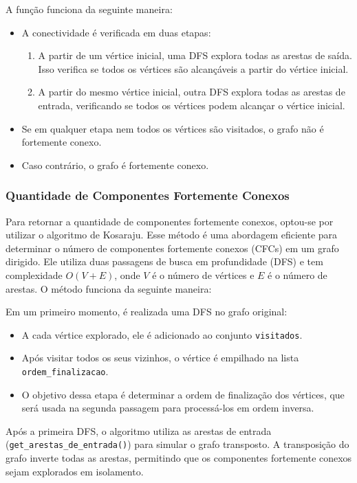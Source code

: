 \documentclass[12pt]{article}
\begin{document}
A função funciona da seguinte maneira:

\begin{itemize}
  \item A conectividade é verificada em duas etapas:
  \begin{enumerate}
    \item A partir de um vértice inicial, uma DFS explora todas as arestas de saída. Isso verifica se todos os vértices são alcançáveis a partir do vértice inicial.
    \item A partir do mesmo vértice inicial, outra DFS explora todas as arestas de entrada, verificando se todos os vértices podem alcançar o vértice inicial.
  \end{enumerate}
  \item Se em qualquer etapa nem todos os vértices são visitados, o grafo não é fortemente conexo.
  \item Caso contrário, o grafo é fortemente conexo.
\end{itemize}

\subsubsection{Quantidade de Componentes Fortemente Conexos}

Para retornar a quantidade de componentes fortemente conexos, optou-se por utilizar o algoritmo de Kosaraju. Esse método é uma abordagem eficiente para determinar o número de componentes fortemente conexos (CFCs) em um grafo dirigido. Ele utiliza duas passagens de busca em profundidade (DFS) e tem complexidade \(O(V + E)\), onde \(V\) é o número de vértices e \(E\) é o número de arestas. O método funciona da seguinte maneira:

Em um primeiro momento, é realizada uma DFS no grafo original:
\begin{itemize}
  \item A cada vértice explorado, ele é adicionado ao conjunto \texttt{visitados}.
  \item Após visitar todos os seus vizinhos, o vértice é empilhado na lista \texttt{ordem\_finalizacao}.
  \item O objetivo dessa etapa é determinar a ordem de finalização dos vértices, que será usada na segunda passagem para processá-los em ordem inversa.
\end{itemize}

Após a primeira DFS, o algoritmo utiliza as arestas de entrada (\texttt{get\_arestas\_de\_entrada()}) para simular o grafo transposto. A transposição do grafo inverte todas as arestas, permitindo que os componentes fortemente conexos sejam explorados em isolamento.
\end{document}

